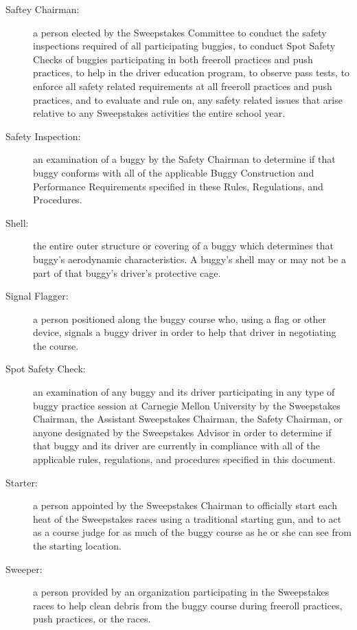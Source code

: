 \begin{description}
	\item[Saftey Chairman:]
	a person elected by the Sweepstakes Committee to conduct the safety
	inspections required of all participating buggies, to conduct Spot Safety
	Checks of buggies participating in both freeroll practices and push practices,
	to help in the driver education program, to observe pass tests, to enforce all
	safety related requirements at all freeroll practices and push practices, and
	to evaluate and rule on, any safety related issues that arise relative to any
	Sweepstakes activities the entire school year.

	\item[Safety Inspection:]
	an examination of a buggy by the Safety Chairman to determine if that buggy
	conforms with all of the applicable Buggy Construction and Performance
	Requirements specified in these Rules, Regulations, and Procedures.

	\item[Shell:]
	the entire outer structure or covering of a buggy which determines that
	buggy's aerodynamic characteristics. A buggy's shell may or may not be a part
	of that buggy's driver's protective cage.

	\item[Signal Flagger:]
	a person positioned along the buggy course who, using a flag or other
	device, signals a buggy driver in order to help that driver in negotiating the
	course.

	\item[Spot Safety Check:]
	an examination of any buggy and its driver participating in any type of
	buggy practice session at Carnegie Mellon University by the Sweepstakes
	Chairman, the Assistant Sweepstakes Chairman, the Safety Chairman, or anyone
	designated by the Sweepstakes Advisor in order to determine if that buggy and
	its driver are currently in compliance with all of the applicable rules,
	regulations, and procedures specified in this document.

	\item[Starter:]
	a person appointed by the Sweepstakes Chairman to officially start each
	heat of the Sweepstakes races using a traditional starting gun, and to act as a
	course judge for as much of the buggy course as he or she can see from the
	starting location.

	\item[Sweeper:]
	a person provided by an organization participating in the Sweepstakes races
	to help clean debris from the buggy course during freeroll practices, push
	practices, or the races.


\end{description}
